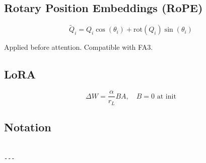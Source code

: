 \subsection{Rotary Position Embeddings (RoPE)}

\[
\tilde{Q}_i = Q_i \cos(\theta_i) + \text{rot}(Q_i) \sin(\theta_i)
\tag{3.7}
\]

Applied before attention. Compatible with FA3.

\subsection{LoRA}

\[
\Delta W = \frac{\alpha}{r_L} B A, \quad B = 0 \text{ at init}
\tag{3.8}
\]

\subsection{Notation}

\begin{lstlisting}

---
\end{lstlisting}